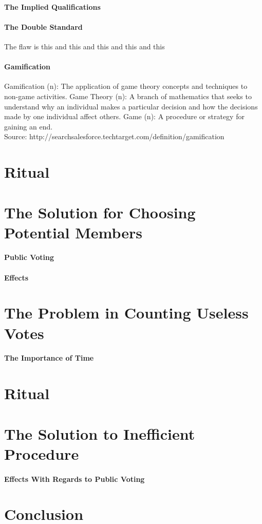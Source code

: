 \documentclass{article}
\begin{document}
    \paragraph{The Implied Qualifications} %
    \paragraph{The Double Standard} %
      The flaw is this and this and this
      and this and this
    \paragraph{Gamification}
      Gamification (n): The application of game theory concepts and techniques to non-game activities.
      Game Theory (n): A branch of mathematics that seeks to understand why an individual makes a particular
      decision and how the decisions made by one individual affect others.
      Game (n): A procedure or strategy for gaining an end.
      \\Source: http://searchsalesforce.techtarget.com/definition/gamification
  \section{Ritual}
  \section{The Solution for Choosing Potential Members}
    \paragraph{Public Voting}
    \paragraph{Effects}

  \section{The Problem in Counting Useless Votes} %
    \paragraph{The Importance of Time}
  \section{Ritual}
  \section{The Solution to Inefficient Procedure}
    \paragraph{}
    \paragraph{Effects With Regards to Public Voting}
  \section{Conclusion}
\end{document}
